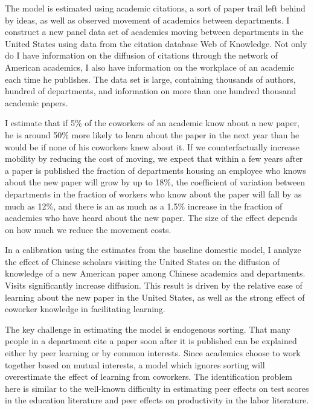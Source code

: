 The model is estimated using academic citations, a sort of paper trail
left behind by ideas, as well as observed movement of academics between
departments. I construct a new panel data set of academics moving between
departments in the United States using data from the citation database Web of
Knowledge. Not only do I have information on the diffusion of citations
through the network of American academics, I also have information on the
workplace of an academic each time he publishes. The data set is large,
containing thousands of authors, hundred of departments, and information
on more than one hundred thousand academic papers.

I estimate that if 5\% of the coworkers of an academic know about a new paper,
he is around 50\% more likely to learn about the paper in the next year than he would be if
none of his coworkers knew about it.  If we counterfactually increase mobility
by reducing the cost of moving, we expect that within a few years after a paper is published the fraction of departments
housing an employee who knows about the new paper will grow by up to 18\%, the coefficient of variation between departments in the
fraction of workers who know about the paper will fall by as much as 12\%, and there is an as much as a 1.5\% increase in the fraction 
of academics who have heard about the new paper.  The size of the effect depends on how much we reduce the
movement costs.

In a calibration using the estimates from the baseline domestic model, I analyze the
effect of Chinese scholars visiting the United States on the diffusion of knowledge of a new
American paper among Chinese academics and departments.  Visits significantly increase diffusion.
This result is driven by the relative ease of learning about the new paper in the United States, as well as 
the strong effect of coworker knowledge in facilitating learning.

The key challenge in estimating the model is endogenous sorting. That many people in a department 
cite a paper soon after it is published can be explained either by peer learning or by common interests.
Since academics choose to work together based on mutual interests, a model 
which ignores sorting will overestimate the effect of learning from coworkers.  The identification
problem here is similar to the well-known difficulty in estimating peer
effects on test scores in the education literature and peer effects on
productivity in the labor literature.

